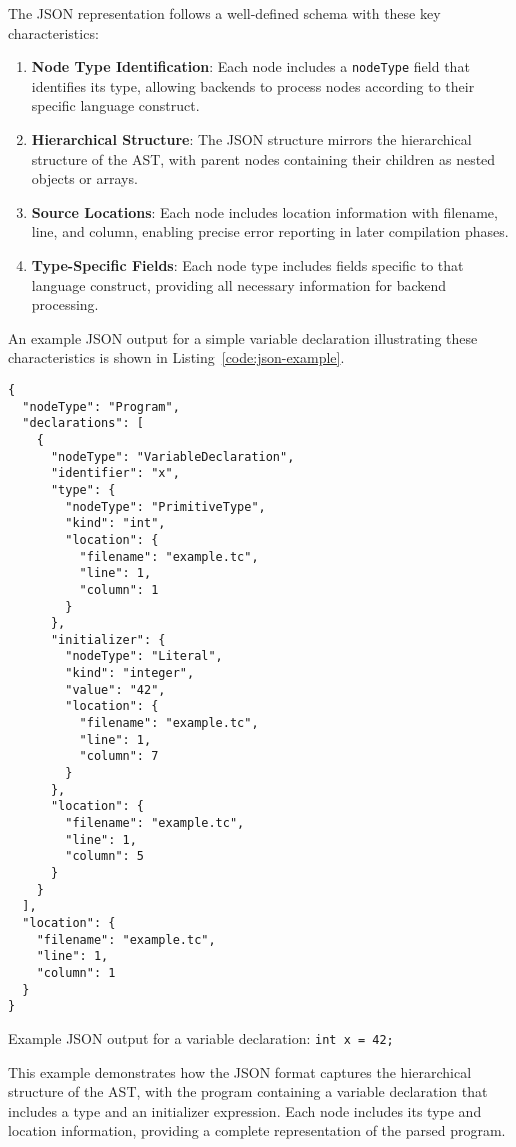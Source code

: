 The JSON representation follows a well-defined schema with these key characteristics:

\begin{enumerate}
    \item \textbf{Node Type Identification}: Each node includes a \texttt{nodeType} field that identifies its type, allowing backends to process nodes according to their specific language construct.
    \item \textbf{Hierarchical Structure}: The JSON structure mirrors the hierarchical structure of the AST, with parent nodes containing their children as nested objects or arrays.
    \item \textbf{Source Locations}: Each node includes location information with filename, line, and column, enabling precise error reporting in later compilation phases.
    \item \textbf{Type-Specific Fields}: Each node type includes fields specific to that language construct, providing all necessary information for backend processing.
\end{enumerate}

An example JSON output for a simple variable declaration illustrating these characteristics is shown in Listing~\ref{code:json-example}.

\begin{listing}[h!]
\begin{verbatim}
{
  "nodeType": "Program",
  "declarations": [
    {
      "nodeType": "VariableDeclaration",
      "identifier": "x",
      "type": {
        "nodeType": "PrimitiveType",
        "kind": "int",
        "location": {
          "filename": "example.tc",
          "line": 1,
          "column": 1
        }
      },
      "initializer": {
        "nodeType": "Literal",
        "kind": "integer",
        "value": "42",
        "location": {
          "filename": "example.tc",
          "line": 1,
          "column": 7
        }
      },
      "location": {
        "filename": "example.tc",
        "line": 1,
        "column": 5
      }
    }
  ],
  "location": {
    "filename": "example.tc",
    "line": 1,
    "column": 1
  }
}
\end{verbatim}
\caption{Example JSON output for a variable declaration: \texttt{int x = 42;}}
\label{code:json-example}
\end{listing}

This example demonstrates how the JSON format captures the hierarchical structure of the AST, with the program containing a variable declaration that includes a type and an initializer expression. Each node includes its type and location information, providing a complete representation of the parsed program.



